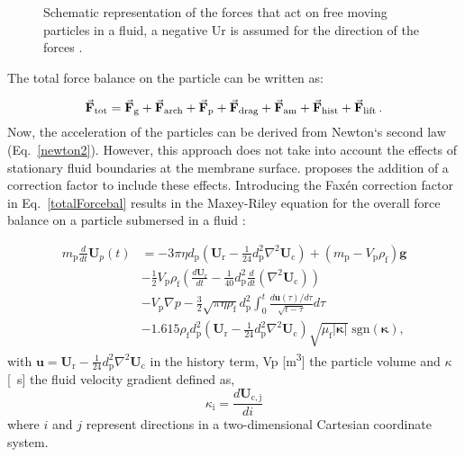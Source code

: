 \begin{figure}[H]
    \centering
    \def\svgwidth{0.7\columnwidth}
    
    \caption{Schematic representation of the forces that act on free moving particles in a fluid, a negative \gls{Ur} is assumed for the direction of the forces \citep{Ghijs2014}.}
    \label{forcebal}
\end{figure}

The total force balance on the particle can be written as:

\begin{equation}
 \vec{\mathbf{F}}_\mathrm{tot}=\vec{\mathbf{F}}_\mathrm{g}+\vec{\mathbf{F}}_\mathrm{arch}+\vec{\mathbf{F}}_\mathrm{p}+\vec{\mathbf{F}}_\mathrm{drag}+\vec{\mathbf{F}}_\mathrm{am}+\vec{\mathbf{F}}_\mathrm{hist}+\vec{\mathbf{F}}_\mathrm{lift} \, .
 \label{totalForcebal}
\end{equation}
 Now, the acceleration of the particles can be derived from Newton`s second law (Eq.\ \eqref{newton2}). However, this approach does not take into account the effects of stationary fluid boundaries at the membrane surface. \cite{Faxen1922} proposes the addition of a correction factor to include these effects. Introducing the Fax\'en correction factor in Eq.\ \eqref{totalForcebal} results in the Maxey-Riley equation for the overall force balance on a particle submersed in a fluid \citep{Maxey1983}:

 \begin{equation}
\begin{split}
	m_\mathrm{p}\frac{d}{dt}\mathbf{U}_p(t) & = -3 \pi \eta d_\mathrm{p} \left( \mathbf{U}_\mathrm{r} - \frac{1}{24}d_\mathrm{p}^2 \nabla^2 \mathbf{U}_\mathrm{c} \right) + \left( m_\mathrm{p} - V_\mathrm{p} \rho_\mathrm{f} \right) \mathbf{g} \\
	 & - \frac{1}{2} V_\mathrm{p} \rho_\mathrm{f} \left( \frac{d \mathbf{U}_\mathrm{r}}{dt} - \frac{1}{40} d_\mathrm{p}^2 \frac{d}{dt}\left( \nabla^2 \mathbf{U}_\mathrm{c}\right) \right) \\
	 & - V_\mathrm{p} \nabla  p - \frac{3}{2} \sqrt{\pi \eta \rho_\mathrm{f}} d_\mathrm{p}^2  \int_{\displaystyle 0}^t \frac{d\mathbf{u}(\tau)/d\tau}{\sqrt{t-\tau}}d\tau \\
	 & - 1.615 \rho_\mathrm{f} d_\mathrm{p}^2 \left( \mathbf{U}_\mathrm{r} - \frac{1}{24}d_\mathrm{p}^2 \nabla^2 \mathbf{U}_\mathrm{c} \right) \sqrt{\mu_\mathrm{f} \left|\mathbf{\kappa} \right|} \; \mathrm{sgn}\left(\mathbf{\kappa} \right),
	 \label{maxeyRiley}
\end{split}
\end{equation}
 with $ \mathbf{u}  = \mathbf{U}_\mathrm{r} - \frac{1}{24}d_\mathrm{p}^2 \nabla^2 \mathbf{U}_\mathrm{c}$ in the history term, \gls{Vp} [\unit{\cubic\metre}] the particle volume and $\kappa$ [\unit{\reciprocal\second}] the fluid velocity gradient defined as,
 \begin{equation}
  \kappa_\mathrm{i}= \frac{d \mathbf{U}_\mathrm{c,j}}{di}
 \end{equation}
where $i$ and $j$ represent directions in a two-dimensional Cartesian coordinate system.

